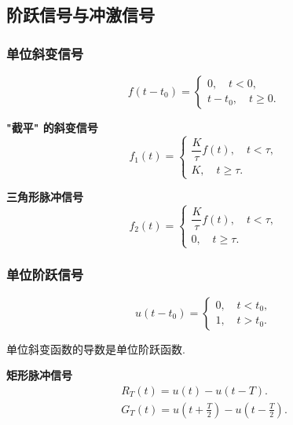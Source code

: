 \subsection{阶跃信号与冲激信号}
\subsubsection{单位斜变信号}

\rmg
\begin{equation}
    f(t-t_0)=\begin{cases}
        0,\quad t<0, \\
        t-t_0,\quad t\geq 0.
    \end{cases}
\end{equation}

\textbf{"截平" 的斜变信号}
\begin{equation}
    f_1(t)=\begin{cases}
        \dfrac{K}{\tau}f(t),\quad t<\tau, \\
        K,\quad t\geq\tau.
    \end{cases}
\end{equation}

\textbf{三角形脉冲信号}
\begin{equation}
    f_2(t)=\begin{cases}
        \dfrac{K}{\tau}f(t),\quad t<\tau, \\
        0,\quad t\geq\tau.
    \end{cases}
\end{equation}

\subsubsection{单位阶跃信号}

\rmg
\begin{equation}
    u(t-t_0)=\begin{cases}
        0,\quad t<t_0, \\
        1,\quad t>t_0.
    \end{cases}
\end{equation}

单位斜变函数的导数是单位阶跃函数.

\textbf{矩形脉冲信号}
\begin{gather}
    R_T(t)=u(t)-u(t-T). \\
    G_T(t)=u\left(t+\frac{T}{2}\right)-u\left(t-\frac{T}{2}\right).
\end{gather}

